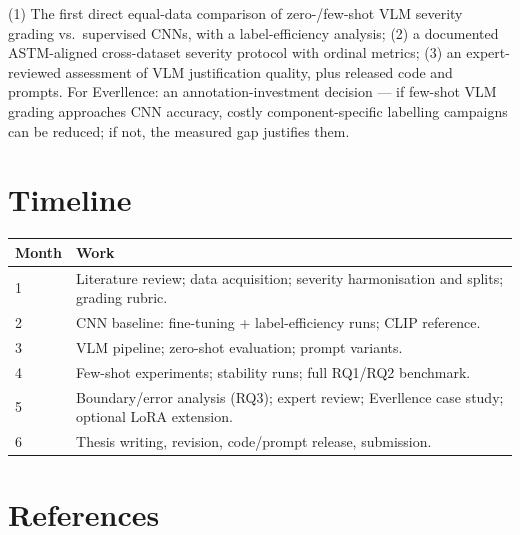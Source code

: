 \documentclass[10pt,a4paper]{article}
\begin{document}
(1) The first direct equal-data comparison of zero-/few-shot VLM severity grading vs.\ supervised CNNs, with a label-efficiency analysis; (2) a documented ASTM-aligned cross-dataset severity protocol with ordinal metrics; (3) an expert-reviewed assessment of VLM justification quality, plus released code and prompts. For Everllence: an annotation-investment decision --- if few-shot VLM grading approaches CNN accuracy, costly component-specific labelling campaigns can be reduced; if not, the measured gap justifies them.

\section{Timeline}

{\small
\begin{tabularx}{\textwidth}{|p{1.6cm}|X|}
\hline
\rowcolor{lightgray} \textbf{Month} & \textbf{Work} \\
\hline
1 & Literature review; data acquisition; severity harmonisation and splits; grading rubric. \\
\hline
2 & CNN baseline: fine-tuning + label-efficiency runs; CLIP reference. \\
\hline
3 & VLM pipeline; zero-shot evaluation; prompt variants. \\
\hline
4 & Few-shot experiments; stability runs; full RQ1/RQ2 benchmark. \\
\hline
5 & Boundary/error analysis (RQ3); expert review; Everllence case study; optional LoRA extension. \\
\hline
6 & Thesis writing, revision, code/prompt release, submission. \\
\hline
\end{tabularx}}

\section{References}
\end{document}
